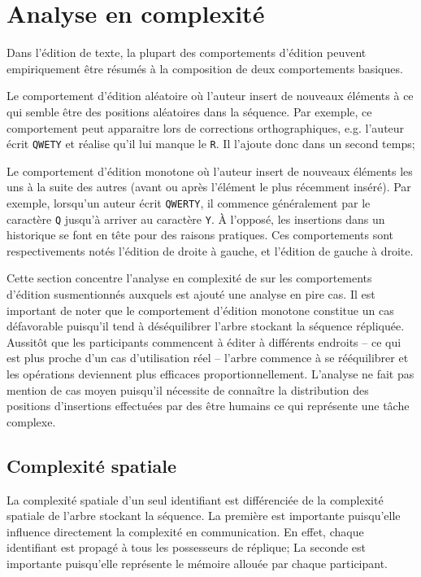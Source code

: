 
\section{Analyse en complexité}
\label{repl:sec:complexity}

Dans l'édition de texte, la plupart des comportements d'édition peuvent
empiriquement être résumés à la composition de deux comportements basiques.
\begin{inparaenum}
\item Le comportement d'édition aléatoire où l'auteur insert de nouveaux
  éléments à ce qui semble être des positions aléatoires dans la séquence. Par
  exemple, ce comportement peut apparaitre lors de corrections orthographiques,
  e.g. l'auteur écrit \texttt{QWETY} et réalise qu'il lui manque le
  \texttt{R}. Il l'ajoute donc dans un second temps;
\item Le comportement d'édition monotone où l'auteur insert de nouveaux éléments
  les uns à la suite des autres (avant ou après l'élément le plus récemment
  inséré). Par exemple, lorsqu'un auteur écrit \texttt{QWERTY}, il commence
  généralement par le caractère \texttt{Q} jusqu'à arriver au caractère
  \texttt{Y}. À l'opposé, les insertions dans un historique se font en tête pour
  des raisons pratiques. Ces comportements sont respectivements notés l'édition
  de droite à gauche, et l'édition de gauche à droite.
\end{inparaenum}

Cette section concentre l'analyse en complexité de \LSEQ sur les comportements
d'édition susmentionnés auxquels est ajouté une analyse en pire cas. Il est
important de noter que le comportement d'édition monotone constitue un cas
défavorable puisqu'il tend à déséquilibrer l'arbre stockant la séquence
répliquée. Aussitôt que les participants commencent à éditer à différents
endroits -- ce qui est plus proche d'un cas d'utilisation réel -- l'arbre
commence à se rééquilibrer et les opérations deviennent plus efficaces
proportionnellement. L'analyse ne fait pas mention de cas moyen puisqu'il
nécessite de connaître la distribution des positions d'insertions effectuées par
des être humains ce qui représente une tâche complexe.

\subsection{Complexité spatiale}

La complexité spatiale d'un seul identifiant est différenciée de la complexité
spatiale de l'arbre stockant la séquence. La première est importante puisqu'elle
influence directement la complexité en communication. En effet, chaque
identifiant est propagé à tous les possesseurs de réplique; La seconde est
importante puisqu'elle représente le mémoire allouée par chaque participant.


